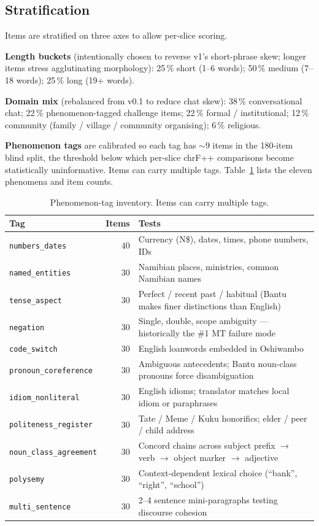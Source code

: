 \documentclass[11pt]{article}
\begin{document}
\subsection{Stratification}

Items are stratified on three axes to allow per-slice scoring.

\textbf{Length buckets} (intentionally chosen to reverse v1's
short-phrase skew; longer items stress agglutinating morphology):
25\,\% short (1--6 words); 50\,\% medium (7--18 words); 25\,\% long
(19+ words).

\textbf{Domain mix} (rebalanced from v0.1 to reduce chat skew):
38\,\% conversational chat; 22\,\% phenomenon-tagged challenge
items; 22\,\% formal / institutional; 12\,\% community (family /
village / community organising); 6\,\% religious.

\textbf{Phenomenon tags} are calibrated so each tag has $\sim 9$
items in the 180-item blind split, the threshold below which
per-slice chrF++ comparisons become statistically uninformative.
Items can carry multiple tags. Table~\ref{tab:phenomena} lists the
eleven phenomena and item counts.

\begin{table}[t]
\centering
\small
\begin{tabular}{lrp{10cm}}
\toprule
\textbf{Tag} & \textbf{Items} & \textbf{Tests} \\
\midrule
\texttt{numbers\_dates} & 40 & Currency (N\$), dates, times, phone numbers, IDs \\
\texttt{named\_entities} & 30 & Namibian places, ministries, common Namibian names \\
\texttt{tense\_aspect} & 30 & Perfect / recent past / habitual (Bantu makes finer distinctions than English) \\
\texttt{negation} & 30 & Single, double, scope ambiguity --- historically the \#1 MT failure mode \citep{hossain2020negation} \\
\texttt{code\_switch} & 30 & English loanwords embedded in Oshiwambo \\
\texttt{pronoun\_coreference} & 30 & Ambiguous antecedents; Bantu noun-class pronouns force disambiguation \\
\texttt{idiom\_nonliteral} & 30 & English idioms; translator matches local idiom or paraphrases \\
\texttt{politeness\_register} & 30 & Tate / Meme / Kuku honorifics; elder / peer / child address \\
\texttt{noun\_class\_agreement} & 30 & Concord chains across subject prefix $\rightarrow$ verb $\rightarrow$ object marker $\rightarrow$ adjective \\
\texttt{polysemy} & 30 & Context-dependent lexical choice (``bank'', ``right'', ``school'') \\
\texttt{multi\_sentence} & 30 & 2--4 sentence mini-paragraphs testing discourse cohesion \\
\bottomrule
\end{tabular}
\caption{Phenomenon-tag inventory. Items can carry multiple tags.}
\label{tab:phenomena}
\end{table}
\end{document}
